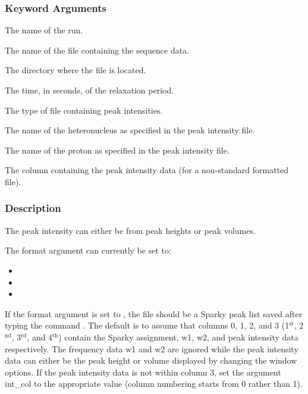   
 \subsubsection{Keyword Arguments} 

   The name of the run.   

   The name of the file containing the sequence data.   

   The directory where the file is located.   

   The time, in seconds, of the relaxation period.   

   The type of file containing peak intensities.   

   The name of the heteronucleus as specified in the peak intensity file.   

   The name of the proton as specified in the peak intensity file.   

   The column containing the peak intensity data (for a non-standard formatted file).  

  

  
 \subsubsection{Description} 

 The peak intensity can either be from peak heights or peak volumes. 
  

 The format argument can currently be set to: 
  

 \begin{itemize} 
 \item[]   
 \item[]   
 \item[]  
 \end{itemize} 
  

 If the format argument is set to , the file should be a Sparky peak list saved after typing the command .  The default is to assume that columns 0, 1, 2, and 3 (1$^\mathrm{st}$, 2$^\mathrm{nd}$, 3$^\mathrm{rd}$, and 4$^\mathrm{th}$) contain the Sparky assignment, w1, w2, and peak intensity data respectively. The frequency data w1 and w2 are ignored while the peak intensity data can either be the peak height or volume displayed by changing the window options.  If the peak intensity data is not within column 3, set the argument int\_col to the appropriate value (column numbering starts from 0 rather than 1). 
  

